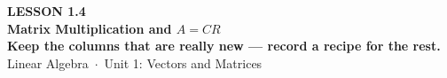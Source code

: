 \documentclass[aspectratio=169, 11pt]{beamer}
\begin{document}
{
\begin{frame}[plain]
  \vspace{2.8cm}\hspace{0.55cm}%
  \begin{minipage}{0.9\textwidth}
    {\color{goldacc}\bfseries\small LESSON 1.4}\\[0.5cm]
    {\color{white}\bfseries\LARGE Matrix Multiplication and $A=CR$}\\[0.3cm]
    {\color{white}\bfseries\large Keep the columns that are really new --- record a recipe for the rest.}\\[1.0cm]
    {\color{blushmid}\small Linear Algebra~$\cdot$~Unit 1: Vectors and Matrices}
  \end{minipage}
\end{frame}
}
\end{document}
